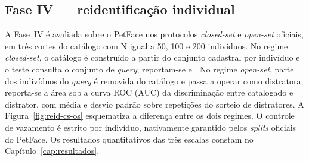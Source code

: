 \subsection*{Fase IV --- reidentificação individual}

A Fase~IV é avaliada sobre o PetFace nos protocolos \textit{closed-set} e \textit{open-set} oficiais, em três cortes do catálogo com N igual a 50, 100 e 200 indivíduos. No regime \textit{closed-set}, o catálogo é construído a partir do conjunto cadastral por indivíduo e o teste consulta o conjunto de \textit{query}; reportam-se  e \mAP. No regime \textit{open-set}, parte dos indivíduos do \textit{query} é removida do catálogo e passa a operar como distratora; reporta-se a área sob a curva ROC (AUC) da discriminação entre catalogado e distrator, com média e desvio padrão sobre repetições do sorteio de distratores. A Figura~\ref{fig:reid-cs-os} esquematiza a diferença entre os dois regimes. O controle de vazamento é estrito por indivíduo, nativamente garantido pelos \textit{splits} oficiais do PetFace. Os resultados quantitativos das três escalas constam no Capítulo~\ref{cap:resultados}.

